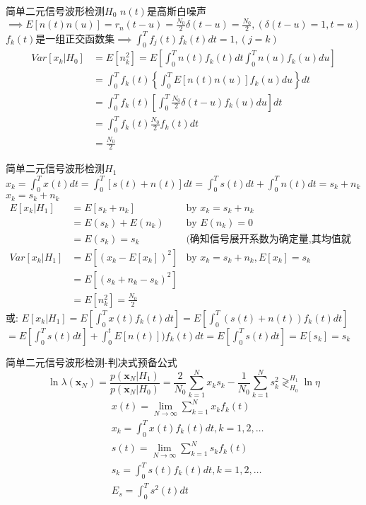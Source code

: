 \begin{frame}{简单二元信号波形检测$H_0$}
$n(t)$是高斯白噪声$\implies E[n(t)n(u)]=r_n(t-u) =\frac{N_0}{2}\delta(t-u)=\frac{N_0}{2},(\delta(t-u)=1,t=u)$ \\
$f_k(t)$是一组正交函数集$\implies\int_{0}^{T}f_j(t)f_k(t)dt=1,(j=k)$
\begin{align*}
Var[x_k|H_0]&=E[n_k^2]=E\left[\int_{0}^{T}n(t)f_k(t)dt\int_{0}^{T}n(u)f_k(u)du\right]\\
&=\int_{0}^{T}f_k(t)\left\{\int_{0}^{T}E[n(t)n(u)]f_k(u)du\right\}dt\\
&=\int_{0}^{T}f_k(t)\left[\int_{0}^{T}\frac{N_0}{2}\delta(t-u)f_k(u)du\right]dt\\
&=\int_{0}^{T}f_k(t)\frac{N_0}{2}f_k(t)dt\\
&=\frac{N_0}{2}
\end{align*}
\end{frame}

\begin{frame}{简单二元信号波形检测$H_1$}
$x_k=\int_{0}^{T}x(t)dt=\int_{0}^{T}[s(t)+n(t)]dt=\int_{0}^{T}s(t)dt+\int_{0}^{T}n(t)dt=s_k+n_k$\\
$x_k=s_k+n_k$
\begin{align*}
E[x_k|H_1]&=E[s_k+n_k]&\text{by }x_k=s_k+n_k \\
&=E(s_k)+E(n_k)&\text{by }E(n_k)=0 \\
&=E(s_k)=s_k&\text{(确知信号展开系数为确定量,其均值就是本身)}\\
Var[x_k|H_1]&=E[(x_k-E[x_k])^2]&\text{by }x_k=s_k+n_k,E[x_k]=s_k\\
&=E[(s_k+n_k-s_k)^2]&\\
&=E[n_k^2]=\frac{N_0}{2}&
\end{align*}
或: $E[x_k|H_1]=E\left[\int_{0}^{T}x(t)f_k(t)dt\right]=E\left[\int_{0}^{T}(s(t)+n(t))f_k(t)dt\right]$\\
$=E\left[\int_{0}^{T}s(t)dt\right]+\int_{0}^{t}E[n(t)])f_k(t)dt=E\left[\int_{0}^{T}s(t)dt\right]=E[s_k]=s_k$
\end{frame}

\begin{frame}{简单二元信号波形检测-判决式预备公式}
\[\ln\lambda(\bm{x}_N)=\frac{p(\bm{x}_N|H_1)}{p(\bm{x}_N|H_0)}=\frac{2}{N_0}\sum\limits_{k=1}^{N}x_ks_k-\frac{1}{N_0}\sum\limits_{k=1}^{N}s_k^2\mathop{\gtrless}_{H_0}^{H_1}\ln\eta \]
\begin{align*}
&x(t)=\lim\limits_{N\to\infty}\sum\limits_{k=1}^Nx_kf_k(t)\\
&x_k=\int_{0}^{T}x(t)f_k(t)dt, k=1,2,\dots\\
&s(t)=\lim\limits_{N\to\infty}\sum\limits_{k=1}^Ns_kf_k(t)\\
&s_k=\int_{0}^{T}s(t)f_k(t)dt, k=1,2,\dots\\
&E_s=\int_{0}^{T}s^2(t)dt
\end{align*}
\end{frame}

